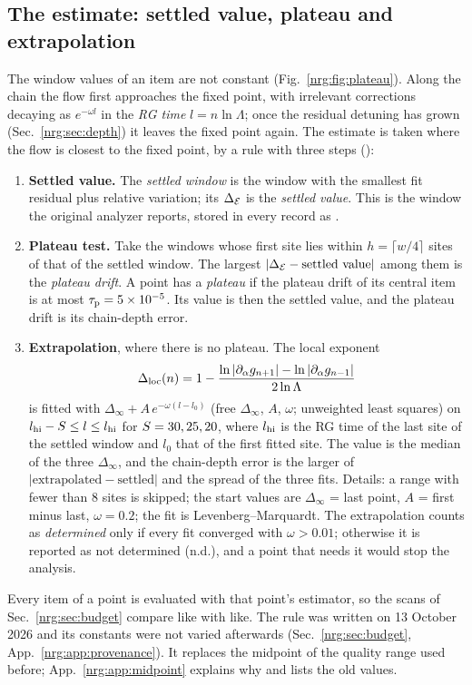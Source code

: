 \subsection{The estimate: settled value, plateau and extrapolation}\label{nrg:sec:estimator}
The window values of an item are not constant (Fig.~\ref{nrg:fig:plateau}). Along the chain the flow first approaches the fixed point,
with irrelevant corrections decaying as $e^{-\omega l}$ in the \emph{RG time} $l=n\ln\Lambda$; once the residual detuning has grown
(Sec.~\ref{nrg:sec:depth}) it leaves the fixed point again. The estimate is taken where the flow is closest to the fixed point, by a rule
with three steps ():
\begin{enumerate}
\item \textbf{Settled value.} The \emph{settled window} is the window with the smallest fit residual plus relative variation; its
  $\Delta_{\mathcal E}$ is the \emph{settled value}. This is the window the original analyzer reports, stored in every record as .
\item \textbf{Plateau test.} Take the windows whose first site lies within $h=\lceil w/4\rceil$ sites of that of the settled window.
  The largest $|\Delta_{\mathcal E}-\text{settled value}|$ among them is the \emph{plateau drift}. A point has a \emph{plateau} if the plateau drift
  of its central item is at most $\tau_{\rm p}=5\times10^{-5}$. Its value is then the settled value, and the plateau drift is its chain-depth
  error.
\item \textbf{Extrapolation}, where there is no plateau. The local exponent
  \begin{equation}
  \Delta_{\rm loc}(n)=1-\frac{\ln|\partial_\alpha g_{n+1}|-\ln|\partial_\alpha g_{n-1}|}{2\ln\Lambda}\label{nrg:eq:loc}
  \end{equation}
  is fitted with $\Delta_\infty+A\,e^{-\omega(l-l_0)}$ (free $\Delta_\infty$, $A$, $\omega$; unweighted least squares) on
  $l_{\rm hi}-S\le l\le l_{\rm hi}$ for $S=30, 25, 20$, where $l_{\rm hi}$ is the RG time of the last site of the settled window and
  $l_0$ that of the first fitted site. The value is the median of the three $\Delta_\infty$, and the chain-depth error is the larger of
  $|\text{extrapolated}-\text{settled}|$ and the spread of the three fits. Details: a range with fewer than 8 sites is skipped; the
  start values are $\Delta_\infty$ = last point, $A$ = first minus last, $\omega=0.2$; the fit is Levenberg--Marquardt. The
  extrapolation counts as \emph{determined} only if every fit converged with $\omega>0.01$; otherwise it is reported as not
  determined (n.d.), and a point that needs it would stop the analysis.
\end{enumerate}
Every item of a point is evaluated with that point's estimator, so the scans of Sec.~\ref{nrg:sec:budget} compare like with like. The rule
was written on 13 October 2026 and its constants were not varied afterwards (Sec.~\ref{nrg:sec:budget}, App.~\ref{nrg:app:provenance}). It replaces the midpoint of
the quality range used before; App.~\ref{nrg:app:midpoint} explains why and lists the old values.

